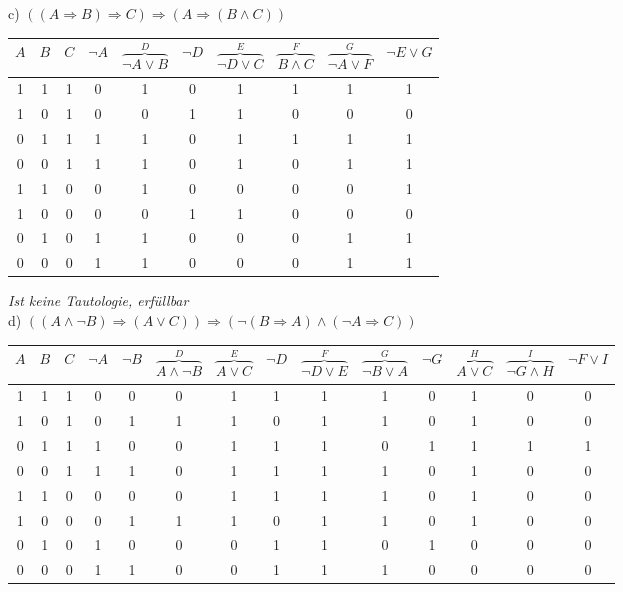 \newpage

c) $((A \Rightarrow B) \Rightarrow C) \Rightarrow (A \Rightarrow (B \land C))$\\

\begin{table}[h]
\centering
\begin{tabular}{c|c|c|c|c|c|c|c|c|c}
$A$ & $B$ & $C$ & $\lnot A$ & $\overbrace{\lnot A \lor B}^{D}$ & $\lnot D$ & $\overbrace{\lnot D \lor C}^{E}$ & $\overbrace{B \land C}^{F}$ & $\overbrace{\lnot A \lor F}^{G}$ & $\lnot E \lor G$\\
\hline
1 & 1 & 1 & 0 & 1 & 0 & 1 & 1 & 1 & 1\\
1 & 0 & 1 & 0 & 0 & 1 & 1 & 0 & 0 & 0\\
0 & 1 & 1 & 1 & 1 & 0 & 1 & 1 & 1 & 1\\
0 & 0 & 1 & 1 & 1 & 0 & 1 & 0 & 1 & 1\\
1 & 1 & 0 & 0 & 1 & 0 & 0 & 0 & 0 & 1\\
1 & 0 & 0 & 0 & 0 & 1 & 1 & 0 & 0 & 0\\
0 & 1 & 0 & 1 & 1 & 0 & 0 & 0 & 1 & 1\\
0 & 0 & 0 & 1 & 1 & 0 & 0 & 0 & 1 & 1\\
\end{tabular}
\end{table}

\textit{Ist keine Tautologie, erfüllbar}\\

d) $((A \land \lnot B) \Rightarrow (A \lor C)) \Rightarrow (\lnot (B \Rightarrow A) \land (\lnot A \Rightarrow C))$\\

\begin{table}[h]
\scriptsize
\centering
\begin{tabular}{c|c|c|c|c|c|c|c|c|c|c|c|c|c}
$A$ & $B$ & $C$ & $\lnot A$ & $\lnot B$ & $\overbrace{A \land \lnot B}^{D}$ & $\overbrace{A \lor C}^{E}$ & $\lnot D$ & $\overbrace{\lnot D \lor E}^{F}$ & $\overbrace{\lnot B \lor A}^{G}$ & $\lnot G$ & $\overbrace{A \lor C}^{H}$ & $\overbrace{\lnot G \land H}^{I}$ & $\lnot F \lor I$\\
\hline
1 & 1 & 1 & 0 & 0 & 0 & 1 & 1 & 1 & 1 & 0 & 1 & 0 & 0\\
1 & 0 & 1 & 0 & 1 & 1 & 1 & 0 & 1 & 1 & 0 & 1 & 0 & 0\\
0 & 1 & 1 & 1 & 0 & 0 & 1 & 1 & 1 & 0 & 1 & 1 & 1 & 1\\
0 & 0 & 1 & 1 & 1 & 0 & 1 & 1 & 1 & 1 & 0 & 1 & 0 & 0\\
1 & 1 & 0 & 0 & 0 & 0 & 1 & 1 & 1 & 1 & 0 & 1 & 0 & 0\\
1 & 0 & 0 & 0 & 1 & 1 & 1 & 0 & 1 & 1 & 0 & 1 & 0 & 0\\
0 & 1 & 0 & 1 & 0 & 0 & 0 & 1 & 1 & 0 & 1 & 0 & 0 & 0\\
0 & 0 & 0 & 1 & 1 & 0 & 0 & 1 & 1 & 1 & 0 & 0 & 0 & 0\\
\end{tabular}
\end{table}

